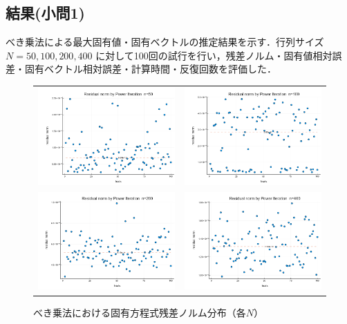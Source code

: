 \documentclass[a4paper,11pt]{ltjsarticle}
\begin{document}
\subsection{結果(小問1)}
べき乗法による最大固有値・固有ベクトルの推定結果を示す．行列サイズ $N=50, 100, 200, 400$ に対して100回の試行を行い，残差ノルム・固有値相対誤差・固有ベクトル相対誤差・計算時間・反復回数を評価した．

\begin{figure}[H]
  \centering
  \begin{tabular}{cc}
    \includegraphics[width=72mm]{graphs/exp3_n50_residual.png} &
    \includegraphics[width=72mm]{graphs/exp3_n100_residual.png} \\
    \includegraphics[width=72mm]{graphs/exp3_n200_residual.png} &
    \includegraphics[width=72mm]{graphs/exp3_n400_residual.png} \\
  \end{tabular}
  \caption{べき乗法における固有方程式残差ノルム分布（各$N$）}
  \label{fig:exp3_residual}
\end{figure}
\end{document}
